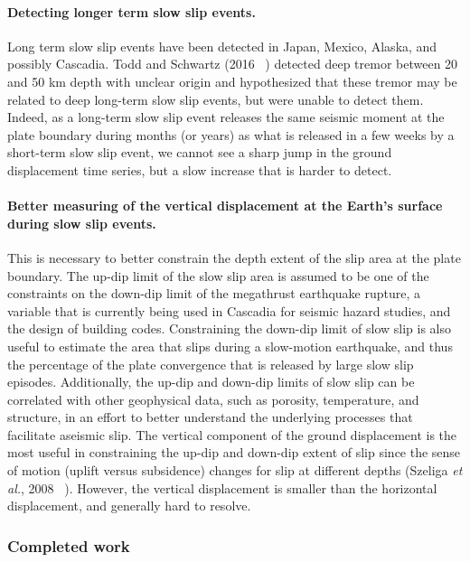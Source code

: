 \documentclass[letterpaper, 12pt]{article}
\begin{document}
\paragraph{Detecting longer term slow slip events.} Long term slow slip events have been detected in Japan, Mexico, Alaska, and possibly Cascadia. Todd and Schwartz (2016 ~\cite{TOD_2016}) detected deep tremor between 20 and 50 km depth with unclear origin and hypothesized that these tremor may be related to deep long-term slow slip events, but were unable to detect them. Indeed, as a long-term slow slip event releases the same seismic moment at the plate boundary during months (or years) as what is released in a few weeks by a short-term slow slip event, we cannot see a sharp jump in the ground displacement time series, but a slow increase that is harder to detect. 

\paragraph{Better measuring of the vertical displacement at the Earth's surface during slow slip events.} This is necessary to better constrain the depth extent of the slip area at the plate boundary. The up-dip limit of the slow slip area is assumed to be one of the constraints on the down-dip limit of the megathrust earthquake rupture, a variable that is currently being used in Cascadia for seismic hazard studies, and the design of building codes. Constraining the down-dip limit of slow slip is also useful to estimate the area that slips during a slow-motion earthquake, and thus the percentage of the plate convergence that is released by large slow slip episodes. Additionally, the up-dip and down-dip limits of slow slip can be correlated with other geophysical data, such as porosity, temperature, and structure, in an effort to better understand the underlying processes that facilitate aseismic slip. The vertical component of the ground displacement is the most useful in constraining the up-dip and down-dip extent of slip since the sense of motion (uplift versus subsidence) changes for slip at different depths (Szeliga \textit{et al.}, 2008 ~\cite{SZE_2008}). However, the vertical displacement is smaller than the horizontal displacement, and generally hard to resolve.

\subsubsection*{Completed work}
\end{document}

